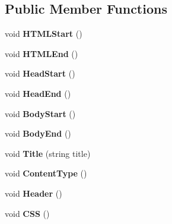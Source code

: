 \subsection*{Public Member Functions}
\begin{DoxyCompactItemize}
\item 
\hypertarget{classHTMLTags_a567551cd701d2836d4240b2917b5e13f}{void {\bfseries H\-T\-M\-L\-Start} ()}\label{classHTMLTags_a567551cd701d2836d4240b2917b5e13f}

\item 
\hypertarget{classHTMLTags_a6553c3d01ee194a1d157e6341333dee3}{void {\bfseries H\-T\-M\-L\-End} ()}\label{classHTMLTags_a6553c3d01ee194a1d157e6341333dee3}

\item 
\hypertarget{classHTMLTags_af2b01cc08884af52e0b291d07035062e}{void {\bfseries Head\-Start} ()}\label{classHTMLTags_af2b01cc08884af52e0b291d07035062e}

\item 
\hypertarget{classHTMLTags_afdc779e46fac16cc79e4f0e87f621254}{void {\bfseries Head\-End} ()}\label{classHTMLTags_afdc779e46fac16cc79e4f0e87f621254}

\item 
\hypertarget{classHTMLTags_af1fb7b90b9ebb83177da18aba1ef86a9}{void {\bfseries Body\-Start} ()}\label{classHTMLTags_af1fb7b90b9ebb83177da18aba1ef86a9}

\item 
\hypertarget{classHTMLTags_a7cae36bd3a0e6f35e89494e5cda64971}{void {\bfseries Body\-End} ()}\label{classHTMLTags_a7cae36bd3a0e6f35e89494e5cda64971}

\item 
\hypertarget{classHTMLTags_a58709141020c51968bf3c1cb5e80f6ad}{void {\bfseries Title} (string title)}\label{classHTMLTags_a58709141020c51968bf3c1cb5e80f6ad}

\item 
\hypertarget{classHTMLTags_a99f117924a26028d703e1bd69576149f}{void {\bfseries Content\-Type} ()}\label{classHTMLTags_a99f117924a26028d703e1bd69576149f}

\item 
\hypertarget{classHTMLTags_a3ea226c0eec2788da99164357c6eda76}{void {\bfseries Header} ()}\label{classHTMLTags_a3ea226c0eec2788da99164357c6eda76}

\item 
\hypertarget{classHTMLTags_afa345b7b6273534b248835b33daa183c}{void {\bfseries C\-S\-S} ()}\label{classHTMLTags_afa345b7b6273534b248835b33daa183c}

\end{DoxyCompactItemize}
